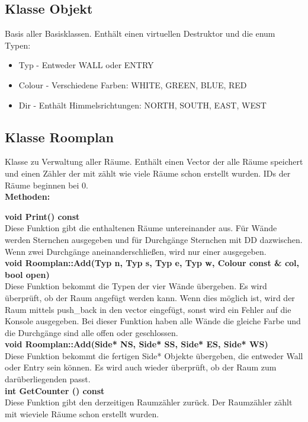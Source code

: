 \documentclass[12pt,a4paper]{article}
\begin{document}
\subsection {Klasse Objekt}
Basis aller Basisklassen. Enthält einen virtuellen Destruktor und die enum Typen: 
\begin {itemize}
	\item Typ -
	Entweder WALL oder ENTRY
	\item Colour -
	Verschiedene Farben: WHITE, GREEN, BLUE, RED
	\item Dir -
	Enthält Himmelsrichtungen: NORTH, SOUTH, EAST, WEST
\end {itemize}


\subsection {Klasse Roomplan}
Klasse zu Verwaltung aller Räume. Enthält einen Vector der alle Räume speichert und einen Zähler der mit zählt wie viele Räume schon erstellt wurden. IDs der Räume beginnen bei 0. \\

\textbf {Methoden:} 

\textbf {void Print() const} \\
Diese Funktion gibt die enthaltenen Räume untereinander aus. Für Wände werden Sternchen ausgegeben und für Durchgänge Sternchen mit DD dazwischen. Wenn zwei Durchgänge aneinanderschließen, wird nur einer ausgegeben.\\


\textbf {void Roomplan::Add(Typ n, Typ s, Typ e, Typ w, Colour const \& col, bool open)} \\
Diese Funktion bekommt die Typen der vier Wände übergeben. Es wird überprüft, ob der Raum angefügt werden kann. Wenn dies möglich ist, wird der Raum mittels push\_back in den vector eingefügt, sonst wird ein Fehler auf die Konsole ausgegeben. Bei dieser Funktion haben alle Wände die gleiche Farbe und die Durchgänge sind alle offen oder geschlossen. \\

\textbf {void Roomplan::Add(Side* NS, Side* SS, Side* ES, Side* WS)} \\
Diese Funktion bekommt die fertigen Side* Objekte übergeben, die entweder Wall oder Entry sein können. Es wird auch wieder überprüft, ob der Raum zum darüberliegenden passt. \\

\textbf {int GetCounter () const} \\
Diese Funktion gibt den derzeitigen Raumzähler zurück. Der Raumzähler zählt mit wieviele Räume schon erstellt wurden. \\
\end{document}
